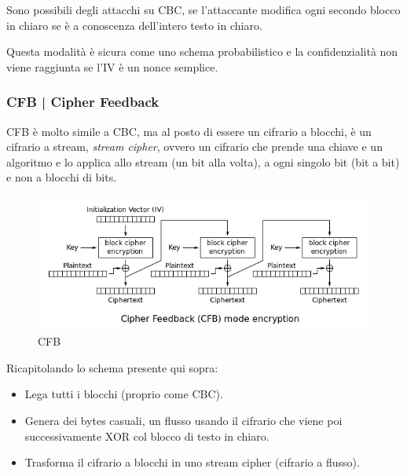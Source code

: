 \textsf{\small Sono possibili degli attacchi su CBC, se l'attaccante modifica ogni secondo blocco in chiaro se è a conoscenza dell'intero testo in chiaro.}

  

\textsf{\small Questa modalità è sicura come uno schema probabilistico e la confidenzialità non viene raggiunta se l'IV è un nonce semplice.} %

\subsubsection{CFB | Cipher Feedback}

   

\textsf{\small CFB è molto simile a CBC, ma al posto di essere un cifrario a blocchi, è un cifrario a stream, \emph{stream cipher}, ovvero un cifrario che prende una chiave e un algoritmo e lo applica allo stream (un bit alla volta), a ogni singolo bit (bit a bit) e non a blocchi di bits.}

\begin{figure}[H]
	\centering
	\includegraphics[width=1\textwidth, height=1\textheight, keepaspectratio]{./images/aes_modes/cfb.png}
	\caption{CFB}
	\label{fig:cfb}
\end{figure}

\textsf{\small Ricapitolando lo schema presente qui sopra:}

   

\begin{itemize}
	\item \textsf{\small Lega tutti i blocchi (proprio come CBC).}
	\item \textsf{\small Genera dei bytes casuali, un flusso usando il cifrario che viene poi successivamente XOR col blocco di testo in chiaro.}
	\item \textsf{\small Trasforma il cifrario a blocchi in uno stream cipher (cifrario a flusso).}
\end{itemize}

